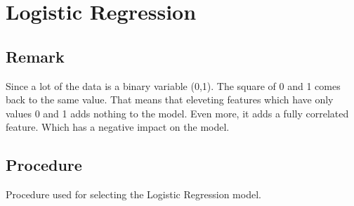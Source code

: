 \documentclass{article}
\begin{document}
\section{Logistic Regression}
\subsection{Remark}

Since a lot of the data is a binary variable (0,1). The square of 0 and 1 comes back to the same value. That means that eleveting features which have only values 0 and 1 adds nothing to the model. Even more, it adds a fully correlated feature. Which has a negative impact on the model.
\\
\subsection{Procedure}

Procedure used for selecting the Logistic Regression model.
\end{document}
